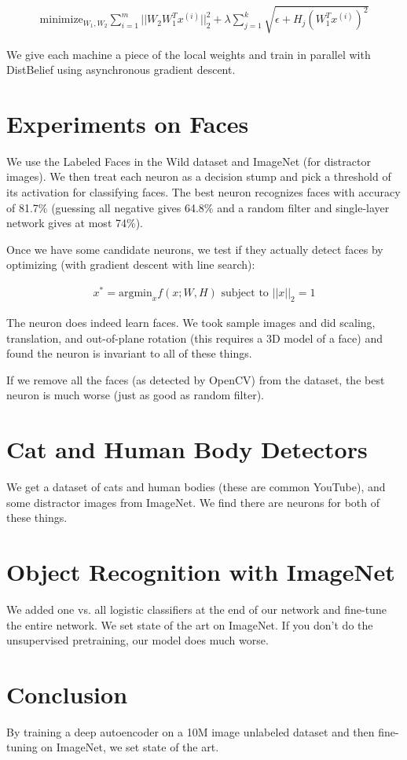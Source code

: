 \documentclass[a4paper]{article}
\begin{document}
\begin{align}
  \text{minimize}_{W_1, W_2}{
    \sum_{i=1}^{m}{
      || W_2 W_1^T x^{(i)} ||_2^2
      + \lambda \sum_{j=1}^{k}{\sqrt{\epsilon + H_j (W_1^T x^{(i)})^2}}
    }
  }
\end{align}

We give each machine a piece of the local weights and train in parallel with
DistBelief using asynchronous gradient descent.

\section{Experiments on Faces}
We use the Labeled Faces in the Wild dataset and ImageNet (for distractor
images). We then treat each neuron as a decision stump and pick a threshold of
its activation for classifying faces. The best neuron recognizes faces with
accuracy of 81.7\% (guessing all negative gives 64.8\% and a random filter 
and single-layer network gives at most 74\%).

Once we have some candidate neurons, we test if they actually detect faces by
optimizing (with gradient descent with line search):

\begin{align}
  x^* = \text{argmin}_{x}{f(x; W, H)} \text{ subject to } ||x||_2 = 1
\end{align}

The neuron does indeed learn faces. We took sample images and did scaling,
translation, and out-of-plane rotation (this requires a 3D model of a face)
and found the neuron is invariant to all of these things.

If we remove all the faces (as detected by OpenCV) from the dataset, the best
neuron is much worse (just as good as random filter).

\section{Cat and Human Body Detectors}
We get a dataset of cats and human bodies (these are common YouTube), and some
distractor images from ImageNet. We find there are neurons for both of these
things.

\section{Object Recognition with ImageNet}
We added one vs. all logistic classifiers at the end of our network and 
fine-tune the entire network. We set state of the art on ImageNet. If you don't
do the unsupervised pretraining, our model does much worse.

\section{Conclusion}
By training a deep autoencoder on a 10M image unlabeled dataset and then 
fine-tuning on ImageNet, we set state of the art.
\end{document}
